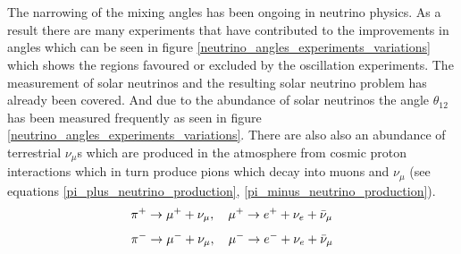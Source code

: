 \\\\The narrowing of the mixing angles has been ongoing in neutrino physics. As a result there are many experiments that have contributed to the improvements in angles which can be seen in figure \ref{neutrino_angles_experiments_variations} 
 which shows the regions favoured or excluded by the oscillation experiments. The measurement of solar neutrinos and the resulting solar neutrino problem has already been covered. And due to the abundance of solar neutrinos the angle $\theta_{12}$ has been measured frequently as seen in figure \ref{neutrino_angles_experiments_variations}. There are also also an abundance of terrestrial $\nu_\mu$s which are produced in the atmosphere from cosmic proton interactions which in turn produce pions which decay into muons and $\nu_\mu$ \cite{griffiths2008book}\cite{griffiths2008neutrinoOscillations} (see equations \ref{pi_plus_neutrino_production}, \ref{pi_minus_neutrino_production}).
\begin{equation}
    \pi^+ \rightarrow \mu^+ + \nu_\mu,\quad \mu^+ \rightarrow e^+ + \nu_e + \Bar{\nu}_\mu 
    \label{pi_plus_neutrino_production}
\end{equation}
\begin{equation}
    \pi^- \rightarrow \mu^- + \nu_\mu, \quad \mu^- \rightarrow e^- + \nu_e + \Bar{\nu}_\mu 
    \label{pi_minus_neutrino_production}
\end{equation}
